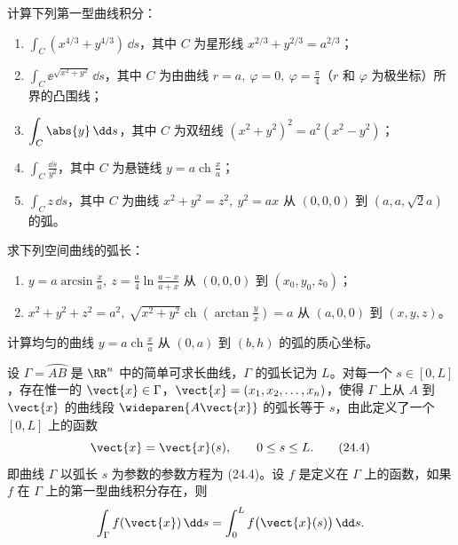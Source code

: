\begin{xexercise}[1]
计算下列第一型曲线积分：
\begin{enumerate}[label=(\arabic*)]
  \item $\displaystyle\int_C(x^{4/3}+y^{4/3})\,\dd s$，其中 $C$ 为星形线 $x^{2/3}+y^{2/3}=a^{2/3}$；
  \item $\displaystyle\int_C \ee^{\sqrt{x^2+y^2}}\,\dd s$，其中 $C$ 为由曲线 $r=a,\ \varphi=0,\ \varphi=\frac\pi4$（$r$ 和 $\varphi$ 为极坐标）所界的凸围线；
  \item $\displaystyle\int_C\abs{y}\,\dd s$，其中 $C$ 为双纽线 $(x^2+y^2)^2=a^2(x^2-y^2)$；
  \item $\displaystyle\int_C\frac{\dd s}{y^2}$，其中 $C$ 为悬链线 $y=a\operatorname{ch}\frac xa$；
  \item $\displaystyle\int_C z\,\dd s$，其中 $C$ 为曲线 $x^2+y^2=z^2,\ y^2=ax$ 从 $(0,0,0)$ 到 $(a,a,\sqrt2a)$ 的弧。
\end{enumerate}
\end{xexercise}\begin{xexercise}[2]
求下列空间曲线的弧长：
\begin{enumerate}[label=(\arabic*)]
  \item $y=a\arcsin\frac xa,\ z=\frac a4\ln\frac{a-x}{a+x}$ 从 $(0,0,0)$ 到 $(x_0,y_0,z_0)$；
  \item $x^2+y^2+z^2=a^2,\ \sqrt{x^2+y^2}\operatorname{ch}\left(\arctan\frac yx\right)=a$ 从 $(a,0,0)$ 到 $(x,y,z)$。
\end{enumerate}
\end{xexercise}\begin{xexercise}[3]
计算均匀的曲线 $y=a\operatorname{ch}\frac xa$ 从 $(0,a)$ 到 $(b,h)$ 的弧的质心坐标。
\end{xexercise}\begin{xexercise}[4]
设 $\Gamma=\wideparen{AB}$ 是 $\RR^n$ 中的简单可求长曲线，$\Gamma$ 的弧长记为 $L$。对每一个 $s\in[0,L]$，存在惟一的 $\vect{x}\in\Gamma$，$\vect{x}=(x_1,x_2,\ldots,x_n)$，使得 $\Gamma$ 上从 $A$ 到 $\vect{x}$ 的曲线段 $\wideparen{A\vect{x}}$ 的弧长等于 $s$，由此定义了一个 $[0,L]$ 上的函数
\begin{equation}
  \vect{x}=\vect{x}(s),\qquad 0\le s\le L.
  \tag{24.4}
  \label{eq:24.4}
\end{equation}
即曲线 $\Gamma$ 以弧长 $s$ 为参数的参数方程为 (24.4)。设 $f$ 是定义在 $\Gamma$ 上的函数，如果 $f$ 在 $\Gamma$ 上的第一型曲线积分存在，则
\[
  \int_\Gamma f(\vect{x})\,\dd s=\int_0^L f\bigl(\vect{x}(s)\bigr)\,\dd s.
\]
\end{xexercise}

